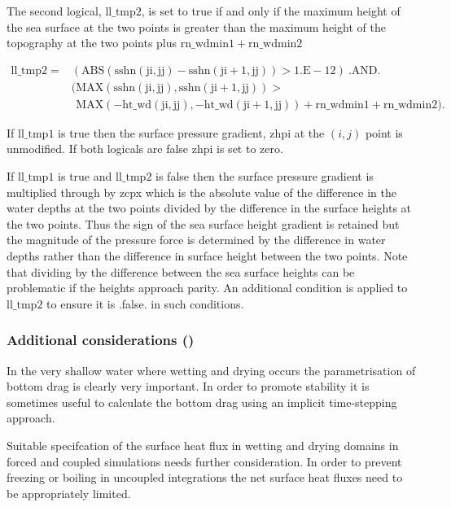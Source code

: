 \documentclass[../main/NEMO_manual]{subfiles}
\begin{document}
The second logical, $\mathrm{ll\_tmp2}$, is set to true if and only if the maximum height
of the sea surface at the two points is greater than the maximum height of the topography
at the two points plus $\mathrm{rn\_wdmin1} + \mathrm{rn\_wdmin2}$

\begin{equation} \label{dyn_ll_tmp2}
\begin{split}
\mathrm{ ll\_tmp2 } = & \mathrm{( ABS( sshn(ji,jj) - sshn(ji+1,jj) ) > 1.E-12 )\ .AND.}\\
& \mathrm{( MAX(sshn(ji,jj), sshn(ji+1,jj)) > } \\
& \mathrm{\phantom{(} MAX(-ht\_wd(ji,jj), -ht\_wd(ji+1,jj)) + rn\_wdmin1 + rn\_wdmin2}) .
\end{split}
\end{equation}

If $\mathrm{ll\_tmp1}$ is true then the surface pressure gradient, zhpi at the $(i,j)$
point is unmodified. If both logicals are false zhpi is set to zero.

If $\mathrm{ll\_tmp1}$ is true and $\mathrm{ll\_tmp2}$ is false then the surface pressure
gradient is multiplied through by zcpx which is the absolute value of the difference in
the water depths at the two points divided by the difference in the surface heights at the
two points. Thus the sign of the sea surface height gradient is retained but the magnitude
of the pressure force is determined by the difference in water depths rather than the
difference in surface height between the two points. Note that dividing by the difference
between the sea surface heights can be problematic if the heights approach parity. An
additional condition is applied to $\mathrm{ ll\_tmp2 }$ to ensure it is .false. in such
conditions.

\subsubsection   [Additional considerations (\textit{usrdef\_zgr})]
         {Additional considerations ()}
\label{subsubsec:WAD_additional}

In the very shallow water where wetting and drying occurs the parametrisation of
bottom drag is clearly very important. In order to promote stability
it is sometimes useful to calculate the bottom drag using an implicit time-stepping approach.

Suitable specifcation of the surface heat flux in wetting and drying domains in forced and
coupled simulations needs further consideration. In order to prevent freezing or boiling
in uncoupled integrations the net surface heat fluxes need to be appropriately limited.
\end{document}
